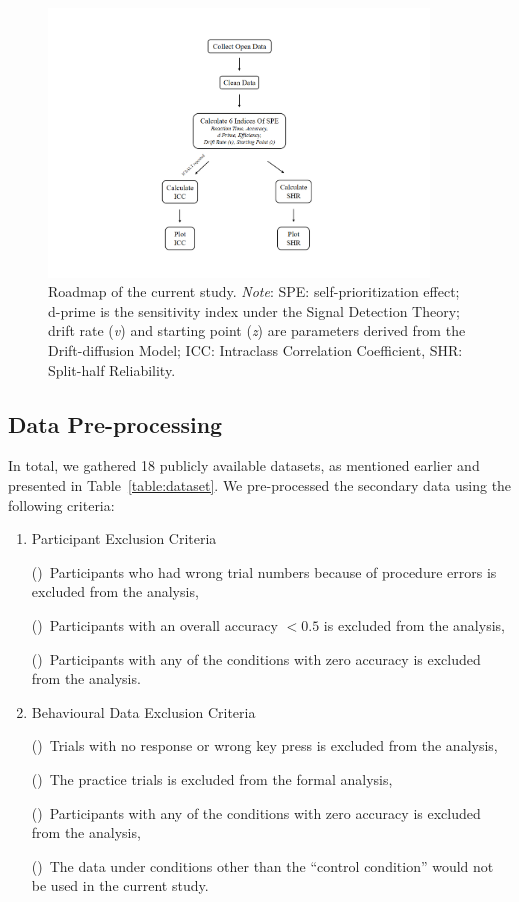 \documentclass[sn-apa]{sn-jnl}%
\theoremstyle{thmstyleone}%
\theoremstyle{thmstyletwo}%
\theoremstyle{thmstylethree}%
\begin{document}
\begin{figure}[h]%
	\centering
	\includegraphics[width=0.9\textwidth]{./Figure/Fig_3_flow_chart.pdf}
	\caption{Roadmap of the current study. \textit{Note}: SPE: self-prioritization effect; d-prime is the sensitivity index under the Signal Detection Theory; drift rate (\emph{v}) and starting point (\emph{z}) are parameters derived from the Drift-diffusion Model; ICC: Intraclass Correlation Coefficient, SHR: Split-half Reliability.
	}
	\label{fig:roadmap}
\end{figure}

\subsection{Data Pre-processing}\label{subsec:data_preprocess}
In total, we gathered 18 publicly available datasets, as mentioned earlier and presented in Table~\ref{table:dataset}. We pre-processed the secondary data using the following criteria:
\begin{enumerate}[1.]
	\item Participant Exclusion Criteria
	
	 ()~Participants who had wrong trial numbers because of procedure errors is excluded from the analysis, 
	 
	 ()~Participants with an overall accuracy $< 0.5$ is excluded from the analysis, 
	 
	 ()~Participants with any of the conditions with zero accuracy is excluded from the analysis.
	 
	\item Behavioural Data Exclusion Criteria
	
	()~Trials with no response or wrong key press is excluded from the analysis,
	
	()~The practice trials is excluded from the formal analysis,  
	
	()~Participants with any of the conditions with zero accuracy is excluded from the analysis,
	
	()~The data under conditions other than the ``control condition'' would not be used in the current study. 
\end{enumerate}
\end{document}

